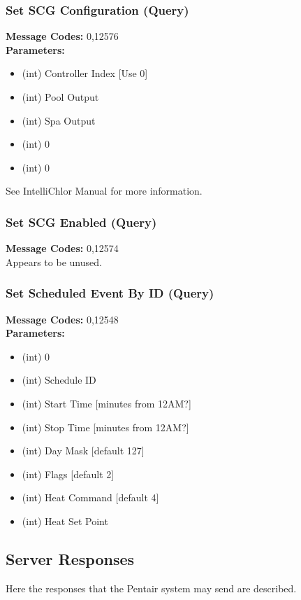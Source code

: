 \documentclass[11pt]{article}
\begin{document}
\subsubsection{Set SCG Configuration (Query)}
\label{msg:12576}
{\bf Message Codes: } 0,12576\\
{\bf Parameters: }
\small
\begin{itemize}
\item (int) Controller Index [Use 0]
\item (int) Pool Output
\item (int) Spa Output
\item (int) 0
\item (int) 0
\end{itemize}
\normalsize
See IntelliChlor Manual for more information.

\subsubsection{Set SCG Enabled (Query)}
\label{msg:12574}
{\bf Message Codes: } 0,12574\\
Appears to be unused.

\subsubsection{Set Scheduled Event By ID (Query)}
\label{msg:12548}
{\bf Message Codes: } 0,12548\\
{\bf Parameters: }
\small
\begin{itemize}
\item (int) 0
\item (int) Schedule ID
\item (int) Start Time [minutes from 12AM?]
\item (int) Stop Time [minutes from 12AM?]
\item (int) Day Mask [default 127]
\item (int) Flags [default 2]
\item (int) Heat Command [default 4]
\item (int) Heat Set Point
\end{itemize}
\normalsize


\clearpage
\subsection{Server Responses}
Here the responses that the Pentair system may send are described.
\end{document}
